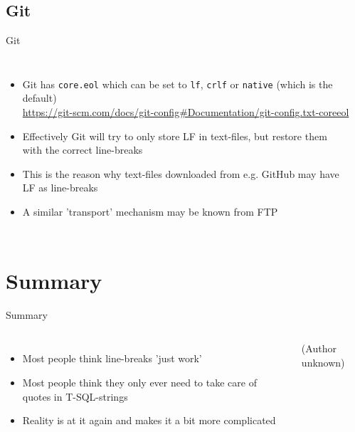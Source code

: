 \documentclass[english,aspectratio=169,handout]{beamer}
\begin{document}
\subsection{Git}
\begin{frame}{Git}
    \begin{columns}
        \begin{itemize}
            \item Git has \texttt{core.eol} which can be set to \texttt{lf}, \texttt{crlf} or \texttt{native} (which is the default)\\
            \url{https://git-scm.com/docs/git-config\#Documentation/git-config.txt-coreeol}
            \item Effectively Git will try to only store LF in text-files, but restore them with the correct line-breaks
            \item This is the reason why text-files downloaded from e.g. GitHub may have LF as line-breaks
            \item A similar 'transport' mechanism may be known from FTP
        \end{itemize}
        \begin{center}
        \end{center}
    \end{columns}
\end{frame}

\section{Summary}

\begin{frame}{Summary}
\begin{columns}
    \begin{itemize}
        \item Most people think line-breaks 'just work'
        \item Most people think they only ever need to take care of quotes in T-SQL-strings
        \item Reality is at it again and makes it a bit more complicated
    \end{itemize}
        \begin{center}
            \tiny(Author unknown)
        \end{center}
\end{columns}
\end{frame}
\end{document}
